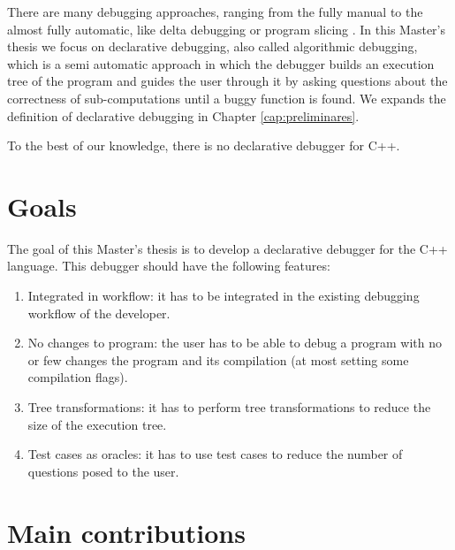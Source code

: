 
There are many debugging approaches, ranging from the fully manual to the almost fully automatic, like delta debugging or program slicing \cite{WhyProgramsFail}. In this Master's thesis we focus on declarative debugging, also called algorithmic debugging, which is a semi automatic approach in which the debugger builds an execution tree of the program and guides the user through it by asking questions about the correctness of sub-computations until a buggy function is found. We expands the definition of declarative debugging in Chapter \ref{cap:preliminares}.


To the best of our knowledge, there is no declarative debugger for C++.

\section{Goals}
The goal of this Master's thesis is to develop a declarative debugger for the C++ language.
This debugger should have the following features:
\begin{enumerate}
  \item Integrated in workflow: it has to be integrated in the existing debugging workflow of the developer. \label{goal1}
  \item No changes to program: the user has to be able to debug a program with no or few changes the program and its compilation (at most setting some compilation flags). \label{goal2}
  \item Tree transformations: it has to perform tree transformations to reduce the size of the execution tree. \label{goal3}
  \item Test cases as oracles: it has to use test cases to reduce the number of questions posed to the user. \label{goal4}
\end{enumerate}

\section{Main contributions}


